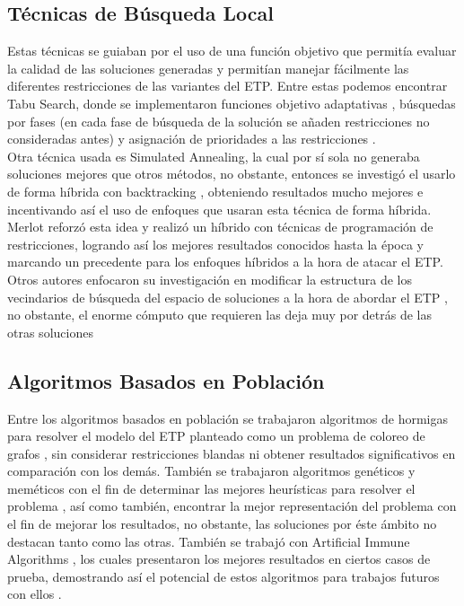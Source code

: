 \documentclass[letter, 10pt]{article}
\begin{document}
\subsection*{Técnicas de Búsqueda Local}

Estas técnicas se guiaban por el uso de una función objetivo que permitía evaluar la calidad de las soluciones generadas y permitían manejar fácilmente las diferentes restricciones de las variantes del ETP. Entre estas podemos encontrar Tabu Search, donde se implementaron funciones objetivo adaptativas \cite{10.1007/3-540-44629-X_7}, búsquedas por fases (en cada fase de búsqueda de la solución se añaden restricciones no consideradas antes) y asignación de prioridades a las restricciones \cite{paquetehmm}.\\ 

Otra técnica usada es Simulated Annealing, la cual por sí sola no generaba soluciones mejores que otros métodos, no obstante, entonces se investigó el usarlo de forma híbrida con backtracking \cite{THOMPSON1998637}, obteniendo resultados mucho mejores e incentivando así el uso de enfoques que usaran esta técnica de forma híbrida. Merlot \cite{10.1007/978-3-540-45157-0_14} reforzó esta idea y realizó un híbrido con técnicas de programación de restricciones, logrando así los mejores resultados conocidos hasta la época y marcando un precedente para los enfoques híbridos a la hora de atacar el ETP.\\

Otros autores enfocaron su investigación en modificar la estructura de los vecindarios de búsqueda del espacio de soluciones a la hora de abordar el ETP , no obstante, el enorme cómputo que requieren las deja muy por detrás de las otras soluciones \cite{Qu2009}

\subsection*{Algoritmos Basados en Población}

Entre los algoritmos basados en población se trabajaron algoritmos de hormigas para resolver el modelo del ETP planteado como un problema de coloreo de grafos \cite{hormigasowo}, sin considerar restricciones blandas ni obtener resultados significativos en comparación con los demás. También se trabajaron algoritmos genéticos y meméticos con el fin de determinar las mejores heurísticas para resolver el problema \cite{10.1007/3-540-44629-X_9, niche, sheibani2002evolutionary}, así como también, encontrar la mejor representación del problema con el fin de mejorar los resultados, no obstante, las soluciones por éste ámbito no destacan tanto como las otras. También se trabajó con Artificial Immune Algorithms \cite{malim2006artificial}, los cuales presentaron los mejores resultados en ciertos casos de prueba, demostrando así el potencial de estos algoritmos para trabajos futuros con ellos \cite{Qu2009}.
\end{document}
